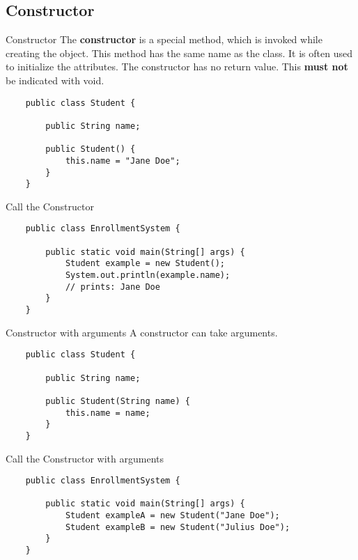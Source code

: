 \subsection{Constructor}
\begin{frame}[fragile]{Constructor}
	The \textbf{constructor} is a special method, which is invoked while creating the object. 
	This method has the same name as the class. It is often used to initialize the attributes.
	The constructor has no return value. 
	This \textbf{must not} be indicated with void.
	\begin{lstlisting}	
	public class Student {
	
	    public String name;
	    
	    public Student() {
	        this.name = "Jane Doe"; 
	    }
	}
	\end{lstlisting}	
\end{frame}
\begin{frame}[fragile]{Call the Constructor}
	\begin{lstlisting}	
	public class EnrollmentSystem {
	    
	    public static void main(String[] args) {
	        Student example = new Student();
	        System.out.println(example.name);
	        // prints: Jane Doe
	    }
	}
	\end{lstlisting}	
\end{frame}
\begin{frame}[fragile]{Constructor with arguments}
	A constructor can take arguments.
	\begin{lstlisting}	
	public class Student {
	
	    public String name;
	    
	    public Student(String name) {
	        this.name = name;	    
	    }
	}
	\end{lstlisting}	
\end{frame}
\begin{frame}[fragile]{Call the Constructor with arguments}
	\begin{lstlisting}	
	public class EnrollmentSystem {
	    
	    public static void main(String[] args) {
	        Student exampleA = new Student("Jane Doe");
	        Student exampleB = new Student("Julius Doe");
	    }
	}
	\end{lstlisting}	
\end{frame}



